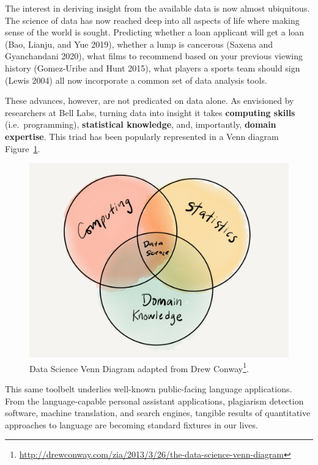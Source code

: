 \documentclass[
  letterpaper,
]{scrbook}
\DeclareRobustCommand{\href}[2]{#2\footnote{\url{#1}}}
\begin{document}
The interest in deriving insight from the available data is now almost
ubiquitous. The science of data has now reached deep into all aspects of
life where making sense of the world is sought. Predicting whether a
loan applicant will get a loan (Bao, Lianju, and Yue 2019), whether a
lump is cancerous (Saxena and Gyanchandani 2020), what films to
recommend based on your previous viewing history (Gomez-Uribe and Hunt
2015), what players a sports team should sign (Lewis 2004) all now
incorporate a common set of data analysis tools.

These advances, however, are not predicated on data alone. As envisioned
by researchers at Bell Labs, turning data into insight it takes
\textbf{computing skills} (i.e.~programming), \textbf{statistical
knowledge}, and, importantly, \textbf{domain expertise}. This triad has
been popularly represented in a Venn diagram
Figure~\ref{fig-intro-data-science-venn}.

\begin{figure}[h]

{\centering \includegraphics[width=7.2in,height=\textheight]{./figures/text-analysis/data-science-venn-paper.png}

}

\caption{\label{fig-intro-data-science-venn}Data Science Venn Diagram
adapted from
\href{http://drewconway.com/zia/2013/3/26/the-data-science-venn-diagram}{Drew
Conway}.}

\end{figure}

This same toolbelt underlies well-known public-facing language
applications. From the language-capable personal assistant applications,
plagiarism detection software, machine translation, and search engines,
tangible results of quantitative approaches to language are becoming
standard fixtures in our lives.
\end{document}
